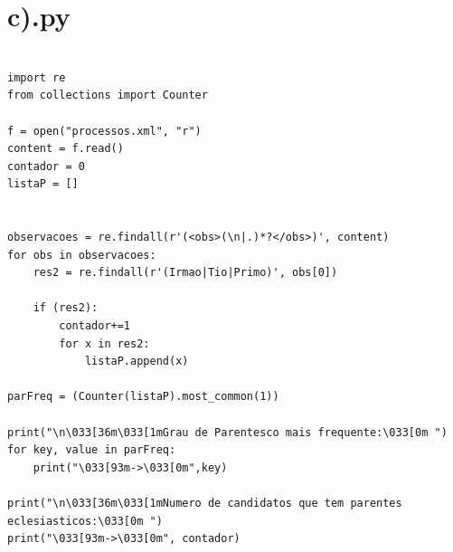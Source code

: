 \documentclass[11pt,a4paper]{report}
\begin{document}
\section*{c).py}
\begin{verbatim}

import re
from collections import Counter

f = open("processos.xml", "r")
content = f.read()
contador = 0
listaP = []


observacoes = re.findall(r'(<obs>(\n|.)*?</obs>)', content)
for obs in observacoes:
    res2 = re.findall(r'(Irmao|Tio|Primo)', obs[0])

    if (res2):
        contador+=1
        for x in res2:
            listaP.append(x)

parFreq = (Counter(listaP).most_common(1))

print("\n\033[36m\033[1mGrau de Parentesco mais frequente:\033[0m ")
for key, value in parFreq:
    print("\033[93m->\033[0m",key)

print("\n\033[36m\033[1mNumero de candidatos que tem parentes eclesiasticos:\033[0m ")
print("\033[93m->\033[0m", contador)

\end{verbatim}
\end{document}
